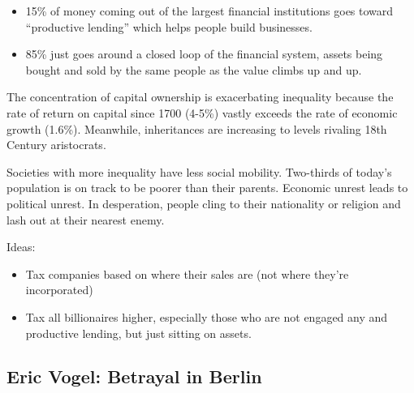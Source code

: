 \documentclass[
]{article}
\begin{document}
\begin{itemize}
\item
  15\% of money coming out of the largest financial institutions goes
  toward ``productive lending'' which helps people build businesses.
\item
  85\% just goes around a closed loop of the financial system, assets
  being bought and sold by the same people as the value climbs up and
  up.
\end{itemize}

The concentration of capital ownership is exacerbating inequality
because the rate of return on capital since 1700 (4-5\%) vastly exceeds
the rate of economic growth (1.6\%). Meanwhile, inheritances are
increasing to levels rivaling 18th Century aristocrats.

Societies with more inequality have less social mobility. Two-thirds of
today's population is on track to be poorer than their parents. Economic
unrest leads to political unrest. In desperation, people cling to their
nationality or religion and lash out at their nearest enemy.

Ideas:

\begin{itemize}
\item
  Tax companies based on where their sales are (not where they're
  incorporated)
\item
  Tax all billionaires higher, especially those who are not engaged any
  and productive lending, but just sitting on assets.
\end{itemize}

\hypertarget{eric-vogel-betrayal-in-berlin}{%
\subsection{Eric Vogel: Betrayal in
Berlin}\label{eric-vogel-betrayal-in-berlin}}
\end{document}
